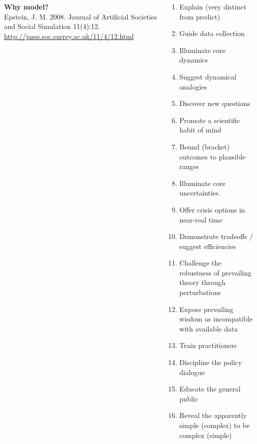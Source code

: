 \documentclass[table, 14pt, aspectratio=169]{beamer}
\newcommand{\hl}[1]{\textcolor{OxfordBlue}{\textbf{#1}}}
\begin{document}
\begin{frame}
  \begin{columns}[T]
    \begin{column}{0.35\textwidth}
      \Large\hl{Why model?}\\
      \vskip 1cm
      \tiny Epstein, J. M. 2008. Journal of Artificial Societies and Social Simulation 11(4):12. \url{http://jasss.soc.surrey.ac.uk/11/4/12.html}
    \end{column}
    \begin{column}{0.65\textwidth}
      \scriptsize
      \begin{enumerate}
        \item Explain (very distinct from predict)
        \item Guide data collection
        \item Illuminate core dynamics
        \item Suggest dynamical analogies
        \item Discover new questions
        \item Promote a scientific habit of mind
        \item Bound (bracket) outcomes to plausible ranges
        \item Illuminate core uncertainties.
        \item Offer crisis options in near-real time
        \item Demonstrate tradeoffs / suggest efficiencies
        \item Challenge the robustness of prevailing theory through perturbations
        \item Expose prevailing wisdom as incompatible with available data
        \item Train practitioners
        \item Discipline the policy dialogue
        \item Educate the general public
        \item Reveal the apparently simple (complex) to be complex (simple) 
      \end{enumerate}
    \end{column}    
  \end{columns}
\end{frame}
\end{document}
